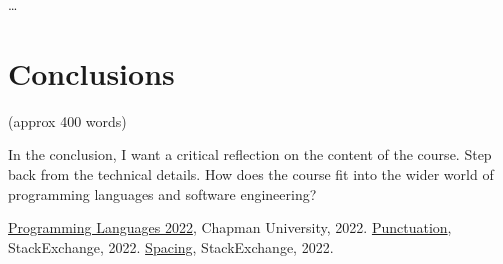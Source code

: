 \documentclass{article}
\theoremstyle{theorem}
\theoremstyle{definition}
\theoremstyle{remark}
\begin{document}
\ldots

\section{Conclusions}\label{conclusions}

(approx 400 words)

In the conclusion, I want a critical reflection on the content of the course. Step back from the technical details. How does the course fit into the wider world of programming languages and software engineering?

\begin{thebibliography}{99}
 \href{https://github.com/alexhkurz/programming-languages-2022/blob/main/README.md}{Programming Languages 2022}, Chapman University, 2022.
 \href{https://tex.stackexchange.com/questions/2369/why-do-the-less-than-symbol-and-the-greater-than-symbol-appear-wrong-as}{Punctuation}, StackExchange, 2022.
 \href{https://tex.stackexchange.com/questions/14526/spaces-behind-textgreater-not-working-as-expected}{Spacing}, StackExchange, 2022.
\end{thebibliography}
\end{document}
